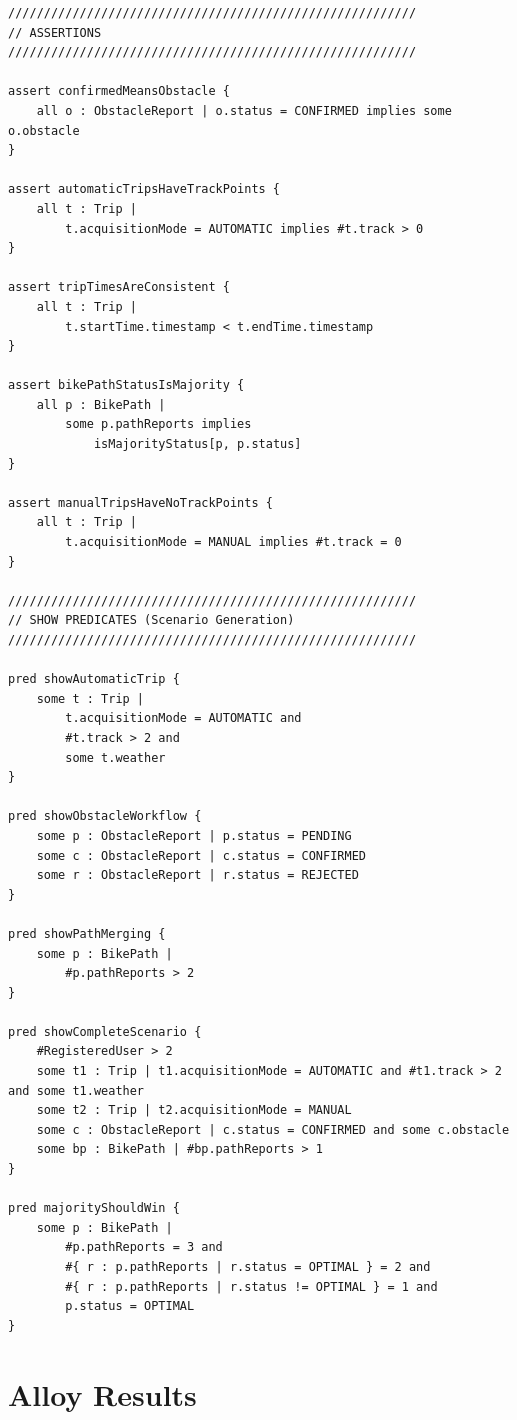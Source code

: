 \begin{lstlisting}[language=Alloy]
/////////////////////////////////////////////////////////
// ASSERTIONS
/////////////////////////////////////////////////////////

assert confirmedMeansObstacle {
    all o : ObstacleReport | o.status = CONFIRMED implies some o.obstacle
}

assert automaticTripsHaveTrackPoints {
    all t : Trip |
        t.acquisitionMode = AUTOMATIC implies #t.track > 0
}

assert tripTimesAreConsistent {
    all t : Trip |
        t.startTime.timestamp < t.endTime.timestamp
}

assert bikePathStatusIsMajority {
    all p : BikePath |
        some p.pathReports implies
            isMajorityStatus[p, p.status]
}

assert manualTripsHaveNoTrackPoints {
    all t : Trip |
        t.acquisitionMode = MANUAL implies #t.track = 0
}

/////////////////////////////////////////////////////////
// SHOW PREDICATES (Scenario Generation)
/////////////////////////////////////////////////////////

pred showAutomaticTrip {
    some t : Trip |
        t.acquisitionMode = AUTOMATIC and
        #t.track > 2 and
        some t.weather
}

pred showObstacleWorkflow {
    some p : ObstacleReport | p.status = PENDING
    some c : ObstacleReport | c.status = CONFIRMED
    some r : ObstacleReport | r.status = REJECTED
}

pred showPathMerging {
    some p : BikePath |
        #p.pathReports > 2
}

pred showCompleteScenario {
    #RegisteredUser > 2
    some t1 : Trip | t1.acquisitionMode = AUTOMATIC and #t1.track > 2 and some t1.weather
    some t2 : Trip | t2.acquisitionMode = MANUAL
    some c : ObstacleReport | c.status = CONFIRMED and some c.obstacle
    some bp : BikePath | #bp.pathReports > 1
}

pred majorityShouldWin {
    some p : BikePath |
        #p.pathReports = 3 and
        #{ r : p.pathReports | r.status = OPTIMAL } = 2 and
        #{ r : p.pathReports | r.status != OPTIMAL } = 1 and
        p.status = OPTIMAL
}
\end{lstlisting}

\section{Alloy Results}
\label{sec:alloy-results}

